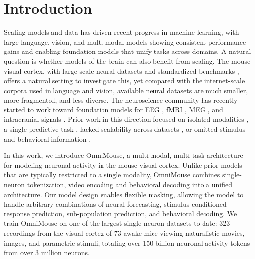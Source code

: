 \documentclass{article} %
\begin{document}
\section{Introduction}
Scaling models and data has driven recent progress in machine learning, with large language, vision, and multi-modal models showing consistent performance gains and enabling foundation models that unify tasks across domains.
A natural question is whether models of the brain can also benefit from scaling. 
The mouse visual cortex, with large-scale neural datasets \citep{microns2021functional,deVries2019,international2025brain} and standardized benchmarks \citep{willeke2022sensorium,sensorium2023}, offers a natural setting to investigate this, yet compared with the internet-scale corpora used in language and vision, available neural datasets are much smaller, more fragmented, and less diverse. 
The neuroscience community has recently started to work toward foundation models for EEG \citep{chau2024population, chen2024eegformer, cui2024neuro, jiang2024large, kostas2021bendr, yang2023biot, thapa2024sleepfm, li2024neurobolt}, fMRI \citep{caro2023brainlm, dong2024brain, kan2022brain, thomas2022self, d2025tribe}, MEG \citep{csaky2024foundational}, and intracranial signals \citep{zhang2023brant, wang2023brainbert}. 
Prior work in this direction focused on isolated modalities \citep{ndtv2, azabou2023unified}, a single predictive task \citep{wang2025foundation}, lacked scalability across datasets \citep{ndt1, mi2023learning, neuroformer}, or omitted stimulus \citep{zhang2025neuralencodingdecodingscale} and behavioral information \citep{jiang2025data, mi2023learning}.

In this work, we introduce OmniMouse, a multi-modal, multi-task architecture for modeling neuronal activity in the mouse visual cortex. 
Unlike prior models that are typically restricted to a single modality, OmniMouse combines single-neuron tokenization, video encoding and behavioral decoding into a unified architecture. 
Our model design enables flexible masking, allowing the model to handle arbitrary combinations of neural forecasting, stimulus-conditioned response prediction, sub-population prediction, and behavioral decoding.
We train OmniMouse on one of the largest single-neuron datasets to date: 323 recordings from the visual cortex of 73 awake mice viewing naturalistic movies, images, and parametric stimuli, totaling over 150 billion neuronal activity tokens from over 3 million neurons. 
\end{document}
